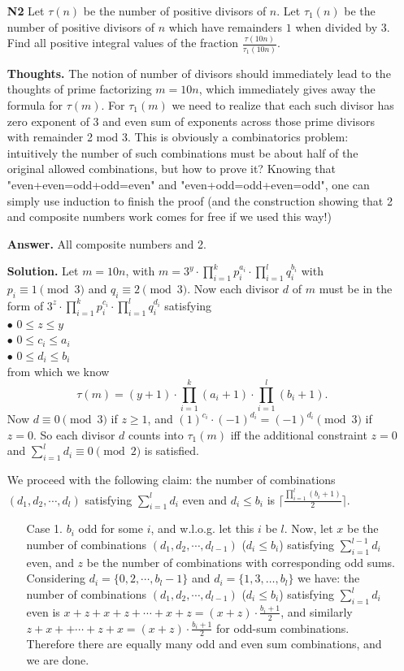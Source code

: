 \documentclass[11pt,a4paper]{article}
\begin{document}
\begin{itemize}
\newpage 

\item[\textbf{N2}]
 Let $\tau(n)$ be the number of positive divisors of $n$. Let $\tau_1(n)$ be the number of positive divisors of $n$ which have remainders $1$ when divided by $3$. Find all positive integral values of the fraction $\frac{\tau(10n)}{\tau_1(10n)}$.

\textbf{Thoughts.} The notion of number of divisors should immediately lead to the thoughts of prime factorizing $m=10n$, which immediately gives away the formula for $\tau(m)$. For $\tau_1(m)$ we need to realize that each such divisor has zero exponent of 3 and even sum of exponents across those prime divisors with remainder 2 mod 3. This is obviously a combinatorics problem: intuitively the number of such combinations must be about half of the original allowed combinations, but how to prove it? Knowing that "even+even=odd+odd=even" and "even+odd=odd+even=odd", one can simply use induction to finish the proof (and the construction showing that 2 and composite numbers work comes for free if we used this way!)

\textbf{Answer.} All composite numbers and 2. 

\textbf{Solution.} 
Let $m=10n$, with $m=3^y\cdot\displaystyle\prod_{i=1}^{k}p_i^{a_i}\cdot\displaystyle\prod_{i=1}^{l}q_i^{b_i}$ with $p_i\equiv 1\pmod{3}$ and $q_i\equiv 2\pmod{3}$. 
Now each divisor $d$ of $m$ must be in the form of $3^z\cdot\displaystyle\prod_{i=1}^{k}p_i^{c_i}\cdot\displaystyle\prod_{i=1}^{l}q_i^{d_i}$ satisfying\\ 
$\bullet$ $0\le z\le y$\\
$\bullet$ $0\le c_i\le a_i$\\
$\bullet$ $0\le d_i\le b_i$\\
from which we know 
\[\tau(m)=(y+1)\cdot\displaystyle\prod_{i=1}^{k}(a_i+1)\cdot\displaystyle\prod_{i=1}^{l}(b_i+1).\]
Now $d\equiv 0\pmod{3}$ if $z\ge 1$, and $(1)^{c_i}\cdot(-1)^{d_i}=(-1)^{d_i}\pmod{3}$ if $z=0$. 
So each divisor $d$ counts into $\tau_1(m)$ iff the additional constraint $z=0$ and $\displaystyle\sum_{i=1}^l d_i\equiv 0\pmod{2}$ is satisfied.  

We proceed with the following claim: 
the number of combinations $(d_1, d_2, \cdots , d_l)$ satisfying $\displaystyle\sum_{i=1}^{l}d_i$ even and $d_i\le b_i$ is 
$\lceil\frac{\prod_{i=1}^{l}(b_i+1)}{2} \rceil$. 
\begin{itemize}
\item[Case 1.] $b_i$ odd for some $i$, and w.l.o.g. let this $i$ be $l$. 
Now, let $x$ be the number of combinations $(d_1, d_2, \cdots , d_{l-1})$ ($d_i\le b_i$) satisfying $\displaystyle\sum_{i=1}^{l-1}d_i$ even, and $z$ be the number of combinations with corresponding odd sums. 
Considering $d_i=\{0, 2, \cdots, b_l-1\}$ and $d_i=\{1,3,\dots , b_l\}$ we have: 
the number of combinations $(d_1, d_2, \cdots , d_{l-1})$ ($d_i\le b_i$) satisfying $\displaystyle\sum_{i=1}^{l}d_i$ even
is $x+z+x+z+\cdots + x+z=(x+z)\cdot\frac{b_i+1}{2}$, 
and similarly $z+x++\cdots +z+x=(x+z)\cdot\frac{b_i+1}{2}$ for odd-sum combinations. 
Therefore there are equally many odd and even sum combinations, and we are done.


\end{itemize}
\end{itemize}
\end{document}

